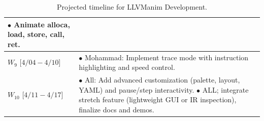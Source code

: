 \begin{table}[htbp]
\begin{tabularx}{\columnwidth}{|>{\centering\arraybackslash}m{2.5cm}|>{\raggedright\arraybackslash}X|}
                           $\bullet$ Animate alloca, load, store, call, ret. \\ \hline
$W_9$    [$4/04 - 4/10$] & $\bullet$ Mohammad: Implement trace mode with instruction highlighting and speed control. \\
$W_{10}$ [$4/11 - 4/17$] & $\bullet$ All: Add advanced customization (palette, layout, YAML) and pause/step interactivity. \newline 
                           $\bullet$ ALL; integrate stretch feature (lightweight GUI or IR inspection), finalize docs and demos. \\ \hline 
\end{tabularx}
\vspace{0.1cm}
\caption{Projected timeline for LLVManim Development.}
\end{table}
